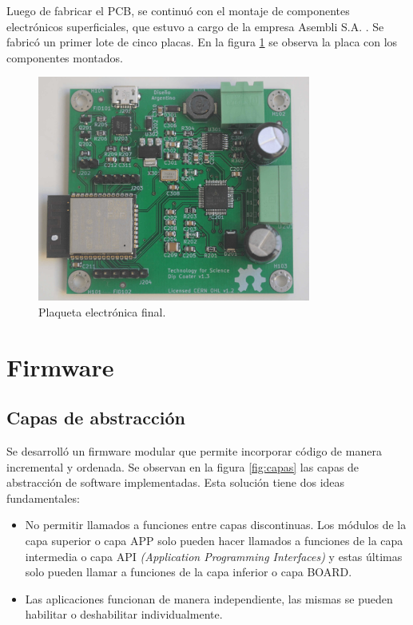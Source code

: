 Luego de fabricar el PCB, se continuó con el montaje de componentes electrónicos superficiales, que estuvo a cargo de la empresa Asembli S.A. \citep{web_asembli}. Se fabricó un primer lote de cinco placas. En la figura \ref{fig:dip_real_model} se observa la placa con los componentes montados.


\begin{figure}[htbp]
	\centering
	\includegraphics[width=0.8\textwidth]{./Figures/dip_real_model.jpg}
	\caption{Plaqueta electrónica final.}
	\label{fig:dip_real_model}
\end{figure}


\section{Firmware}
\subsection{Capas de abstracción}

Se desarrolló un firmware modular que permite incorporar código de manera incremental y ordenada. Se observan en la figura \ref{fig:capas} las capas de abstracción de software implementadas. Esta solución tiene dos ideas fundamentales:

\begin{itemize}
\item No permitir llamados a funciones entre capas discontinuas. Los módulos de la capa superior o capa APP solo pueden hacer llamados a funciones de la capa intermedia o capa API \textit{(Application Programming Interfaces)} y estas últimas solo pueden llamar a funciones de la capa inferior o capa BOARD.
\item Las aplicaciones funcionan de manera independiente, las mismas se pueden habilitar o deshabilitar individualmente.
\end{itemize}

